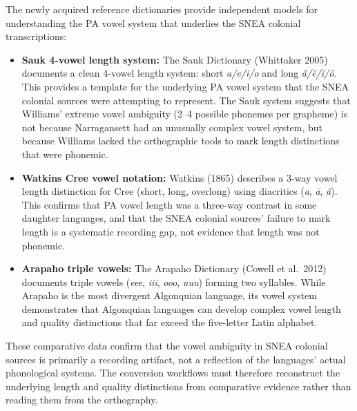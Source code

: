 The newly acquired reference dictionaries provide independent models for
understanding the PA vowel system that underlies the SNEA colonial
transcriptions:

\begin{itemize}
  \item \textbf{Sauk 4-vowel length system:} The Sauk Dictionary (Whittaker
    2005) documents a clean 4-vowel length system: short \textit{a/e/i/o} and
    long \textit{â/ê/î/ô}. This provides a template for the underlying PA
    vowel system that the SNEA colonial sources were attempting to represent.
    The Sauk system suggests that Williams' extreme vowel ambiguity (2--4
    possible phonemes per grapheme) is not because Narragansett had an
    unusually complex vowel system, but because Williams lacked the
    orthographic tools to mark length distinctions that were phonemic.

  \item \textbf{Watkins Cree vowel notation:} Watkins (1865) describes a
    3-way vowel length distinction for Cree (short, long, overlong) using
    diacritics (\textit{a}, \textit{ā}, \textit{â}). This confirms that
    PA vowel length was a three-way contrast in some daughter languages,
    and that the SNEA colonial sources' failure to mark length is a
    systematic recording gap, not evidence that length was not phonemic.

  \item \textbf{Arapaho triple vowels:} The Arapaho Dictionary (Cowell
    et al.\ 2012) documents triple vowels (\textit{eee}, \textit{iii},
    \textit{ooo}, \textit{uuu}) forming two syllables. While Arapaho is
    the most divergent Algonquian language, its vowel system demonstrates
    that Algonquian languages can develop complex vowel length and quality
    distinctions that far exceed the five-letter Latin alphabet.
\end{itemize}

These comparative data confirm that the vowel ambiguity in SNEA colonial
sources is primarily a recording artifact, not a reflection of the
languages' actual phonological systems. The conversion workflows must
therefore reconstruct the underlying length and quality distinctions from
comparative evidence rather than reading them from the orthography.

